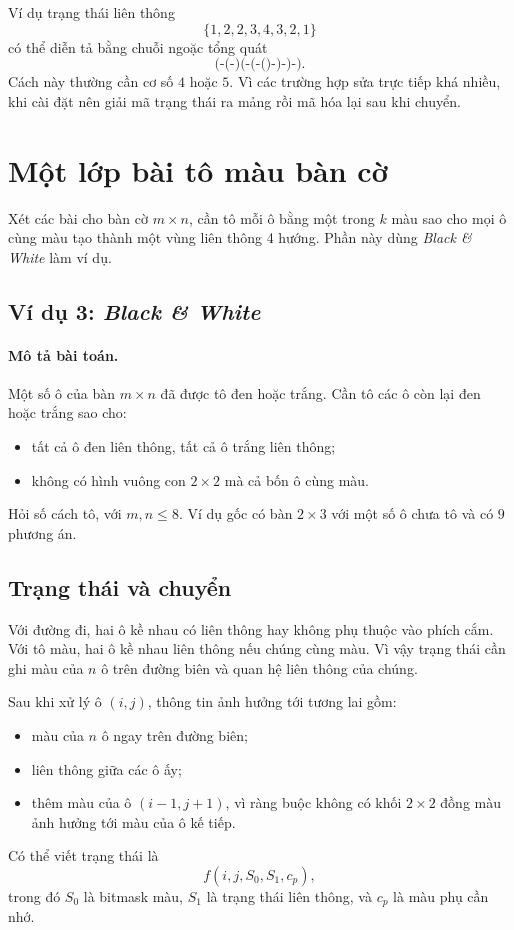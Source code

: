 \documentclass[11pt]{article}
\begin{document}
Ví dụ trạng thái liên thông
\[
  \{1,2,2,3,4,3,2,1\}
\]
có thể diễn tả bằng chuỗi ngoặc tổng quát
\[
  \texttt{(-(-)(-(-()-)-)-)}.
\]
Cách này thường cần cơ số \(4\) hoặc \(5\). Vì các trường hợp sửa trực tiếp
khá nhiều, khi cài đặt nên giải mã trạng thái ra mảng rồi mã hóa lại sau khi
chuyển.

\section{Một lớp bài tô màu bàn cờ}

Xét các bài cho bàn cờ \(m\times n\), cần tô mỗi ô bằng một trong \(k\) màu
sao cho mọi ô cùng màu tạo thành một vùng liên thông 4 hướng. Phần này dùng
\textit{Black \& White} làm ví dụ.

\subsection{Ví dụ 3: \textit{Black \& White}}

\paragraph{Mô tả bài toán.}
Một số ô của bàn \(m\times n\) đã được tô đen hoặc trắng. Cần tô các ô còn lại
đen hoặc trắng sao cho:
\begin{itemize}
  \item tất cả ô đen liên thông, tất cả ô trắng liên thông;
  \item không có hình vuông con \(2\times2\) mà cả bốn ô cùng màu.
\end{itemize}
Hỏi số cách tô, với \(m,n\le 8\). Ví dụ gốc có bàn \(2\times3\) với một số ô
chưa tô và có \(9\) phương án.

\subsection{Trạng thái và chuyển}

Với đường đi, hai ô kề nhau có liên thông hay không phụ thuộc vào phích cắm.
Với tô màu, hai ô kề nhau liên thông nếu chúng cùng màu. Vì vậy trạng thái cần
ghi màu của \(n\) ô trên đường biên và quan hệ liên thông của chúng.

Sau khi xử lý ô \((i,j)\), thông tin ảnh hưởng tới tương lai gồm:
\begin{itemize}
  \item màu của \(n\) ô ngay trên đường biên;
  \item liên thông giữa các ô ấy;
  \item thêm màu của ô \((i-1,j+1)\), vì ràng buộc không có khối \(2\times2\)
  đồng màu ảnh hưởng tới màu của ô kế tiếp.
\end{itemize}
Có thể viết trạng thái là
\[
  f(i,j,S_0,S_1,c_p),
\]
trong đó \(S_0\) là bitmask màu, \(S_1\) là trạng thái liên thông, và \(c_p\)
là màu phụ cần nhớ.
\end{document}
